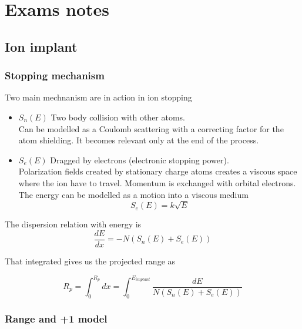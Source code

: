 \chapter{Exams notes}


\section{Ion implant}

\subsection{Stopping mechanism}
Two main mechnanism are in action in ion stopping 

\begin{itemize}
\item $S_n(E)$ Two body collision with other atoms.\\
Can be modelled as a Coulomb scattering with a correcting factor for the atom shielding. It becomes relevant only at the end of the process.\\
 
\item $S_e(E)$ Dragged by electrons (electronic stopping power).\\
Polarization fields created by stationary charge atoms creates a viscous space where the ion have to travel. Momentum is exchanged with orbital electrons.\\ 
The energy can be modelled as a motion into a viscous medium
\begin{equation}
S_e(E)=k\sqrt{E}
\end{equation}

\end{itemize}

The dispersion relation with energy is 
\begin{equation}
\frac{dE}{dx}=-N(S_n(E)+S_e(E))
\end{equation}

That integrated gives us the projected range as

\begin{equation}
R_p=\int_0^{R_p}dx=\int_0^{E_{implant}} \frac{dE}{N\left(S_n(E)+S_e(E)\right)}
\end{equation}

\subsection{Range and +1 model}

